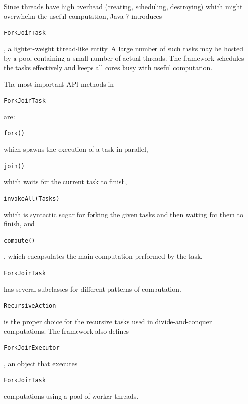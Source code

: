 \documentclass[10pt,twocolumn]{article}
\newcommand{\TechReport}[1]{}
\newcommand{\ConfPaper}[1]{#1}
\newcommand{\code}[1]{\begin{smaller}\texttt{#1}\end{smaller}}
\begin{document}
\ConfPaper{Since threads have high overhead (creating, scheduling,
destroying) which might overwhelm the useful computation, Java 7 introduces 
\code{ForkJoinTask}, a lighter-weight thread-like entity. A large number of
such tasks may be hosted by a pool containing a small number of actual threads.
The framework schedules the tasks effectively and keeps all cores busy with useful 
computation.
}
\TechReport{
Given the nature of divide-and-conquer algorithms, tasks that run in
parallel should have the following characteristics:
\begin{itemize}
  \item they are CPU-bound not I/O-bound, thus they do not block on I/O
  \item depending on the sequential threshold, many tasks (e.g. tens of
  thousands) can be spawned by the recursion branches
  \item they only need to synchronize when waiting for subtasks to complete
\end{itemize}

Given these properties, threads are not a good vehicle for running such
tasks. Threads have high overhead (creating, scheduling, destroying) which
might outperform the useful computation. Therefore Java 7 introduces
\code{ForkJoinTask}, a lighter-weight thread-like entity. A large number of
such tasks may be hosted by a pool containing a small number of actual threads. 
The task scheduling is based on 
\emph{work-stealing}\cite{DougLea'00:forkJoinFramework,Frigo'98:cilk-5}: idle
worker threads ``steal'' work from busy threads. The framework avoids
contention for the data structures that hold the scheduling and ensures that
each theft acquires a large chunk of work, thus making stealing infrequent. It
is this effective scheduling that keeps all the cores busy with useful
computation.
}

The most important API methods in \code{ForkJoinTask} are: \code{fork()}
which spawns the execution of a task in parallel, \code{join()} which
waits for the current task to finish,
\code{invokeAll(Tasks)} which is syntactic sugar for forking the given tasks and
then waiting for them to finish, and \code{compute()}, which encapsulates the main
computation performed by the task. 

\code{ForkJoinTask} has several subclasses for different patterns of
computation. \code{RecursiveAction} is the proper choice for the recursive tasks
used in divide-and-conquer computations. The framework also defines
\code{ForkJoinExecutor}, an object that executes \code{Fork\-Join\-Task}
computations using a pool of worker threads. 
\end{document}

